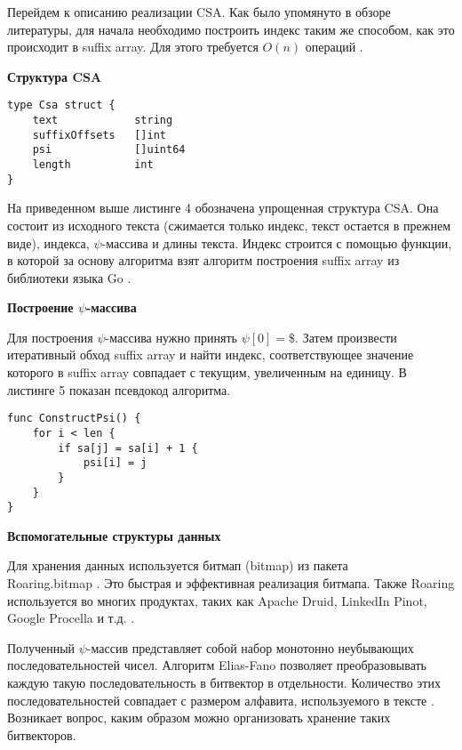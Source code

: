 
Перейдем к описанию реализации CSA. Как было упомянуто в обзоре литературы, для начала необходимо
построить индекс таким же способом, как это происходит в suffix array.
Для этого требуется $O(n)$ операций \cite{huo2014practical}.

\textbf{Структура CSA}

\begin{lstlisting}[caption=CSA structure]
type Csa struct {
	text            string
	suffixOffsets   []int
	psi             []uint64
	length          int
}
\end{lstlisting}

На приведенном выше листинге 4 обозначена упрощенная структура CSA. Она состоит из исходного текста
(сжимается только индекс, текст остается в прежнем виде), индекса, $\psi$-массива и длины текста.
Индекс строится с помощью функции, в которой за основу алгоритма взят алгоритм построения suffix array
из библиотеки языка Go \cite{golang2016sa}.

\textbf{Построение $\psi$-массива}

Для построения $\psi$-массива нужно принять $\psi[0] = \$$. Затем произвести итеративный обход
suffix array и найти индекс, соответствующее значение которого в suffix array совпадает с текущим,
увеличенным на единицу. В листинге 5 показан псевдокод алгоритма.

\begin{lstlisting}[caption=Построение CSA]
func ConstructPsi() {
	for i < len {
		if sa[j] = sa[i] + 1 {
			psi[i] = j
		}
	}
}
\end{lstlisting}

\textbf{Вспомогательные структуры данных}

Для хранения данных используется битмап (bitmap) из пакета\\ Roaring.bitmap \cite{bitmap2021roaring}.
Это быстрая и эффективная реализация битмапа. Также Roaring используется во многих продуктах,
таких как Apache Druid, LinkedIn Pinot, Google Procella и т.д. \cite{bitmap2021daniel}.

Полученный $\psi$-массив представляет собой набор монотонно неубывающих последовательностей чисел.
Алгоритм Elias-Fano позволяет преобразовывать каждую такую последовательность в битвектор в отдельности.
Количество этих последовательностей совпадает с размером алфавита, используемого в тексте \cite{andersensimple}.
Возникает вопрос, каким образом можно организовать хранение таких битвекторов.

